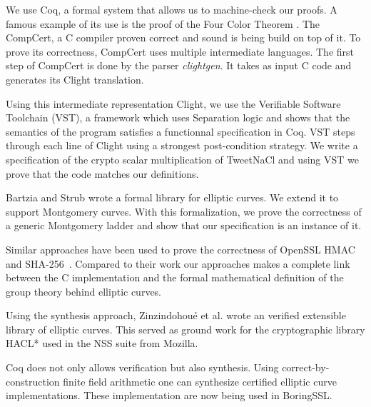 We use Coq\cite{coq-faq}, a formal system that allows us to machine-check our proofs.
A famous example of its use is the proof of the Four Color Theorem \cite{gonthier2008formal}.
The CompCert, a C compiler\cite{Leroy-backend} proven correct and sound is being build on top of it.
To prove its correctness, CompCert uses multiple intermediate languages. The first step of CompCert is done by the parser \textit{clightgen}.
It takes as input C code and generates its Clight\cite{Blazy-Leroy-Clight-09} translation.

Using this intermediate representation Clight, we use the Verifiable Software Toolchain
(VST)\cite{2012-Appel}, a framework which uses Separation logic\cite{1969-Hoare,Reynolds02separationlogic}
and shows that the semantics of the program satisfies a functionnal specification in Coq.
VST steps through each line of Clight using a strongest post-condition strategy.
We write a specification of the crypto scalar multiplication of TweetNaCl and using
VST we prove that the code matches our definitions.

Bartzia and Strub wrote a formal library for elliptic curves\cite{DBLP:conf/itp/BartziaS14}.
We extend it to support Montgomery curves. With this formalization, we prove the
correctness of a generic Montgomery ladder and show that our specification is an instance of it.



Similar approaches have been used to prove the correctness of OpenSSL HMAC~\cite{Beringer2015VerifiedCA} 
and SHA-256~\cite{2015-Appel}. Compared to their work
our approaches makes a complete link between the C implementation and the formal
mathematical definition of the group theory behind elliptic curves.

Using the synthesis approach, Zinzindohou{\'{e}} et al. wrote an verified extensible
library of elliptic curves\cite{Zinzindohoue2016AVE}. This served as ground work for the
cryptographic library HACL*\cite{zinzindohoue2017hacl} used in the NSS suite from Mozilla.

Coq does not only allows verification but also synthesis.
Using correct-by-construction finite field arithmetic\cite{Philipoom2018CorrectbyconstructionFF}
one can synthesize\cite{Erbsen2016SystematicSO} certified elliptic curve
implementations\cite{Erbsen2017CraftingCE}. These implementation are now being used in BoringSSL\cite{fiat-crypto}.


